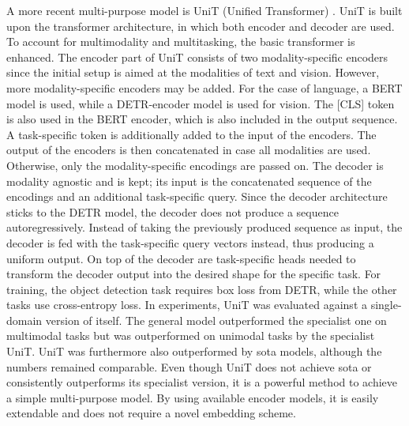 \documentclass[
]{krantz}
\begin{document}
A more recent multi-purpose model is UniT (Unified Transformer) \citep{Hu2021}. UniT is built upon the transformer architecture, in which both encoder and decoder are used.
To account for multimodality and multitasking, the basic transformer \citep{vaswani2017attention} is enhanced. The encoder part of UniT consists of two modality-specific encoders since the initial setup is aimed at the modalities of text and vision. However, more modality-specific encoders may be added. For the case of language, a BERT model \citep{Devlin2018} is used, while a DETR-encoder model \citep{Carion2020} is used for vision. The {[}CLS{]} token is also used in the BERT encoder, which is also included in the output sequence. A task-specific token is additionally added to the input of the encoders. The output of the encoders is then concatenated in case all modalities are used. Otherwise, only the modality-specific encodings are passed on. The decoder is modality agnostic and is kept; its input is the concatenated sequence of the encodings and an additional task-specific query. Since the decoder architecture sticks to the DETR model, the decoder does not produce a sequence autoregressively. Instead of taking the previously produced sequence as input, the decoder is fed with the task-specific query vectors instead, thus producing a uniform output. On top of the decoder are task-specific heads needed to transform the decoder output into the desired shape for the specific task.
For training, the object detection task requires box loss from DETR, while the other tasks use cross-entropy loss. In experiments, UniT was evaluated against a single-domain version of itself. The general model outperformed the specialist one on multimodal tasks but was outperformed on unimodal tasks by the specialist UniT. UniT was furthermore also outperformed by sota models, although the numbers remained comparable.
Even though UniT does not achieve sota or consistently outperforms its specialist version, it is a powerful method to achieve a simple multi-purpose model. By using available encoder models, it is easily extendable and does not require a novel embedding scheme.
\end{document}
